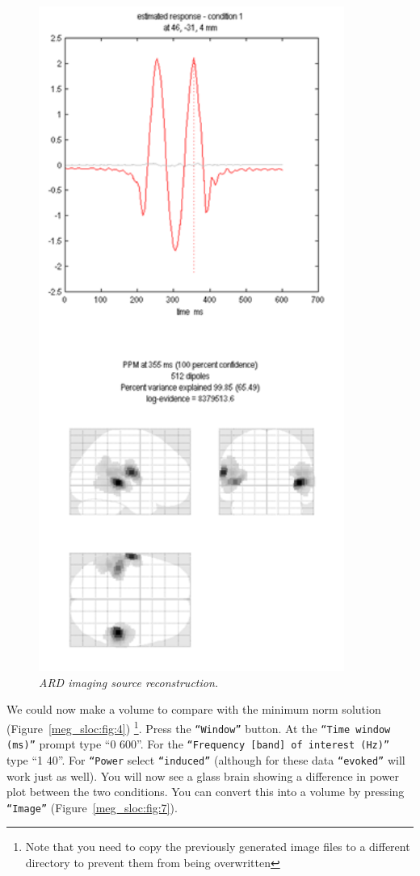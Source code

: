\begin{figure}
\begin{center}
\includegraphics[width=100mm]{meg_sloc/slide6}
\caption{\em ARD imaging source reconstruction.\label{meg_sloc:fig:6}}
\end{center}
\end{figure}


We could now make a volume to compare with the minimum norm solution (Figure~\ref{meg_sloc:fig:4}) \footnote{Note that you need to copy the previously generated image files to a different directory to prevent them from being overwritten}. Press the \texttt{``Window''} button. At the \texttt{``Time window (ms)''} prompt type ``0 600''. For the \texttt{``Frequency [band] of interest (Hz)''} type ``1 40''. For \texttt{``Power} select \texttt{``induced''} (although for these data \texttt{``evoked''} will work just as well). You will now see a glass brain showing a difference in power plot between the two conditions. You can convert this into a volume by pressing \texttt{``Image''} (Figure~\ref{meg_sloc:fig:7}).

